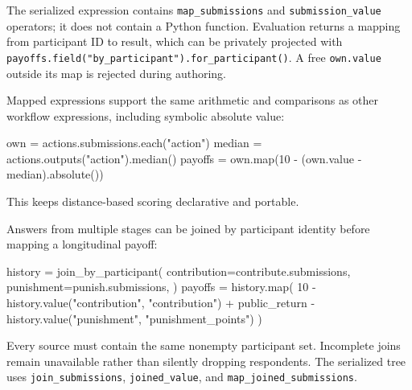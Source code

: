 \documentclass[
  10pt,
]{report}
\newenvironment{Shaded}{}{}
\newcommand{\BuiltInTok}[1]{\textcolor[rgb]{0.00,0.50,0.00}{#1}}
\newcommand{\DecValTok}[1]{\textcolor[rgb]{0.25,0.63,0.44}{#1}}
\newcommand{\NormalTok}[1]{#1}
\newcommand{\OperatorTok}[1]{\textcolor[rgb]{0.40,0.40,0.40}{#1}}
\newcommand{\StringTok}[1]{\textcolor[rgb]{0.25,0.44,0.63}{#1}}
\begin{document}
The serialized expression contains \texttt{map\_submissions} and
\texttt{submission\_value} operators; it does not contain a Python
function. Evaluation returns a mapping from participant ID to result,
which can be privately projected with
\texttt{payoffs.field("by\_participant").for\_participant()}. A free
\texttt{own.value} outside its map is rejected during authoring.

Mapped expressions support the same arithmetic and comparisons as other
workflow expressions, including symbolic absolute value:

\begin{Shaded}
\begin{Highlighting}[]
\NormalTok{own }\OperatorTok{=}\NormalTok{ actions.submissions.each(}\StringTok{"action"}\NormalTok{)}
\NormalTok{median }\OperatorTok{=}\NormalTok{ actions.outputs(}\StringTok{"action"}\NormalTok{).median()}
\NormalTok{payoffs }\OperatorTok{=}\NormalTok{ own.}\BuiltInTok{map}\NormalTok{(}\DecValTok{10} \OperatorTok{{-}}\NormalTok{ (own.value }\OperatorTok{{-}}\NormalTok{ median).absolute())}
\end{Highlighting}
\end{Shaded}

This keeps distance-based scoring declarative and portable.

Answers from multiple stages can be joined by participant identity
before mapping a longitudinal payoff:

\begin{Shaded}
\begin{Highlighting}[]
\NormalTok{history }\OperatorTok{=}\NormalTok{ join\_by\_participant(}
\NormalTok{    contribution}\OperatorTok{=}\NormalTok{contribute.submissions,}
\NormalTok{    punishment}\OperatorTok{=}\NormalTok{punish.submissions,}
\NormalTok{)}
\NormalTok{payoffs }\OperatorTok{=}\NormalTok{ history.}\BuiltInTok{map}\NormalTok{(}
    \DecValTok{10}
    \OperatorTok{{-}}\NormalTok{ history.value(}\StringTok{"contribution"}\NormalTok{, }\StringTok{"contribution"}\NormalTok{)}
    \OperatorTok{+}\NormalTok{ public\_return}
    \OperatorTok{{-}}\NormalTok{ history.value(}\StringTok{"punishment"}\NormalTok{, }\StringTok{"punishment\_points"}\NormalTok{)}
\NormalTok{)}
\end{Highlighting}
\end{Shaded}

Every source must contain the same nonempty participant set. Incomplete
joins remain unavailable rather than silently dropping respondents. The
serialized tree uses \texttt{join\_submissions}, \texttt{joined\_value},
and \texttt{map\_joined\_submissions}.
\end{document}
